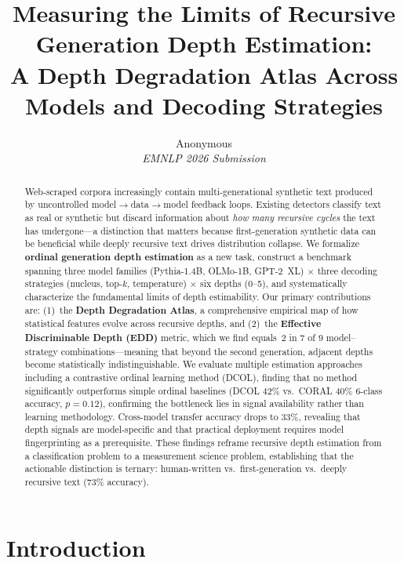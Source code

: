 \documentclass[11pt,a4paper]{article}
\title{Measuring the Limits of Recursive Generation Depth Estimation:\\
A Depth Degradation Atlas Across Models and Decoding Strategies}
\author{Anonymous \\
\textit{EMNLP 2026 Submission}}
\begin{document}
\maketitle

\begin{abstract}
Web-scraped corpora increasingly contain multi-generational synthetic text produced by uncontrolled model$\to$data$\to$model feedback loops.
Existing detectors classify text as real or synthetic but discard information about \emph{how many recursive cycles} the text has undergone---a distinction that matters because first-generation synthetic data can be beneficial while deeply recursive text drives distribution collapse.
We formalize \textbf{ordinal generation depth estimation} as a new task, construct a benchmark spanning three model families (Pythia-1.4B, OLMo-1B, GPT-2~XL) $\times$ three decoding strategies (nucleus, top-$k$, temperature) $\times$ six depths (0--5), and systematically characterize the fundamental limits of depth estimability.
Our primary contributions are: (1)~the \textbf{Depth Degradation Atlas}, a comprehensive empirical map of how statistical features evolve across recursive depths, and (2)~the \textbf{Effective Discriminable Depth (EDD)} metric, which we find equals~2 in 7 of 9 model--strategy combinations---meaning that beyond the second generation, adjacent depths become statistically indistinguishable.
We evaluate multiple estimation approaches including a contrastive ordinal learning method (DCOL), finding that no method significantly outperforms simple ordinal baselines (DCOL 42\% vs.\ CORAL 40\% 6-class accuracy, $p=0.12$), confirming the bottleneck lies in signal availability rather than learning methodology.
Cross-model transfer accuracy drops to 33\%, revealing that depth signals are model-specific and that practical deployment requires model fingerprinting as a prerequisite.
These findings reframe recursive depth estimation from a classification problem to a measurement science problem, establishing that the actionable distinction is ternary: human-written vs.\ first-generation vs.\ deeply recursive text (73\% accuracy).
\end{abstract}

\section{Introduction}
\end{document}
